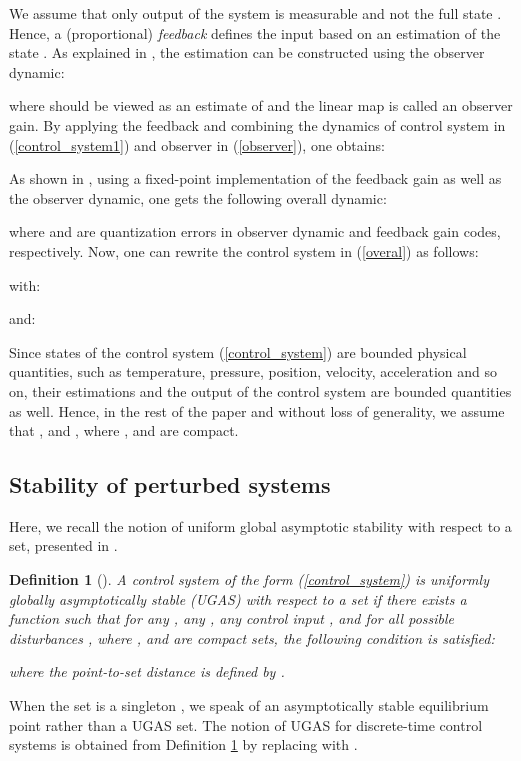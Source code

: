 \documentclass{amsart}
\newtheorem{definition}[theorem]{Definition}
\numberwithin{equation}{section}
\begin{document}
We assume that only output of the system  is measurable and not the full state . 
Hence, a (proportional) {\em feedback}  defines the input  based on an estimation  of the state . 
As explained in \cite{joao}, the estimation  can be constructed using the observer dynamic:

where  should be viewed as an estimate of  and the linear map  is called an observer gain. 
By applying the feedback  and combining the dynamics of control system in (\ref{control_system1}) and 
observer in (\ref{observer}), one obtains:


As shown in \cite{anta}, using a fixed-point implementation of the feedback gain as well as the observer dynamic, 
one gets the following overall dynamic:

where  and  are quantization errors in observer dynamic and feedback gain codes, respectively. 
Now, one can rewrite the control system in (\ref{overal}) as follows:

with: 

and:

Since states of the control system (\ref{control_system}) are bounded physical quantities, such as 
temperature, pressure, position, velocity, acceleration and so on, their estimations and the output of the control system are bounded quantities as well. Hence, in the rest of the paper and without loss of generality, we assume that , and , where , and  are compact.

\subsection{Stability of perturbed systems}

Here, we recall the notion of uniform global asymptotic stability with respect to a set, 
presented in \cite{lin}. 

\begin{definition}[\cite{lin}]
\label{UGAS}
A control system of the form (\ref{control_system}) is uniformly globally asymptotically stable (UGAS) 
with respect to a set  if there exists a  
function  such that for any , any , any control input , and for all possible disturbances , where , and  are compact sets, the following condition is satisfied:
 
where the {\em point-to-set distance}  is defined by \mbox{}. 
\end{definition}

When the set  is a singleton , we speak of an asymptotically stable equilibrium
point  rather than a UGAS set. The notion of UGAS for discrete-time control systems is obtained from Definition \ref{UGAS} by replacing  with .
\end{document}
